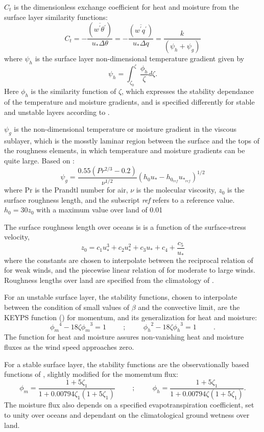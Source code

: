 $C_t$ is the dimensionless exchange coefficient for heat and 
moisture from the surface layer similarity functions:
\[
{C_t} = -\frac{( \overline{w^{\prime}\theta^{\prime}}) }{ u_* \Delta \theta } =
-\frac{( \overline{w^{\prime}q^{\prime}}) }{ u_* \Delta q } =
\frac{ k }{ (\psi_{h} + \psi_{g}) }
\]
where $\psi_h$ is the surface layer non-dimensional temperature gradient given by
\[
\psi_{h} = {\int_{\zeta_{0}}^{\zeta} \frac{\phi_{h} }{ \zeta} d \zeta} .
\]
Here $\phi_h$ is the similarity function of $\zeta$, which expresses the stability dependance of
the temperature and moisture gradients, and is specified differently for stable and unstable
layers according to \cite{helfschu:95}.

$\psi_g$ is the non-dimensional temperature or moisture gradient in the viscous sublayer, 
which is the mosstly laminar region between the surface and the tops of the roughness 
elements, in which temperature and moisture gradients can be quite large.
Based on \cite{yagkad:74}:
\[
\psi_{g} = \frac{ 0.55 (Pr^{2/3} - 0.2) }{ \nu^{1/2} }
(h_{0}u_{*} - h_{0_{ref}}u_{*_{ref}})^{1/2}
\]
where Pr is the Prandtl number for air, $\nu$ is the molecular viscosity, $z_{0}$ is the 
surface roughness length, and the subscript {\em ref} refers to a reference value.
$h_{0} = 30z_{0}$ with a maximum value over land of 0.01
 
The surface roughness length over oceans is is a function of the surface-stress velocity,
\[
{z_0} = c_1u^3_* + c_2u^2_* + c_3u_* + c_4 + \frac{c_5 }{ u_*}
\]
where the constants are chosen to interpolate between the reciprocal relation of
\cite{kondo:75} for weak winds, and the piecewise linear relation of \cite{larpond:81}
for moderate to large winds.  Roughness lengths over land are specified
from the climatology of \cite{dorsell:89}.

For an unstable surface layer, the stability functions, chosen to interpolate between the
condition of small values of $\beta$ and the convective limit, are the KEYPS function 
(\cite{pano:73}) for momentum, and its generalization for heat and moisture:  
\[
{\phi_m}^4 - 18 \zeta {\phi_m}^3 = 1 \hspace{1cm} ; \hspace{1cm} 
{\phi_h}^2 - 18 \zeta {\phi_h}^3 = 1 \hspace{1cm} .
\]
The function for heat and moisture assures non-vanishing heat and moisture fluxes as the wind 
speed approaches zero. 

For a stable surface layer, the stability functions are the observationally 
based functions of \cite{clarke:70},  slightly modified for
the momemtum flux:  
\[
{\phi_m} = \frac{ 1 + 5 {{\zeta}_1} }{ 1 + 0.00794 {\zeta}_1
(1+ 5 {\zeta}_1) } \hspace{1cm} ; \hspace{1cm}
{\phi_h} = \frac{ 1 + 5 {{\zeta}_1} }{ 1 + 0.00794 {\zeta}
(1+ 5 {{\zeta}_1}) } .
\]
The moisture flux also depends on a specified evapotranspiration
coefficient, set to unity over oceans and dependant on the climatological ground wetness over
land.  

